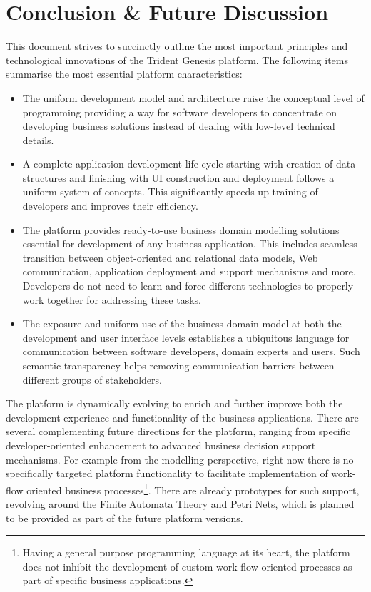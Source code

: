 \section{Conclusion \& Future Discussion}\label{sec:08}

  This document strives to succinctly outline the most important principles and technological innovations of the Trident Genesis platform.
  The following items summarise the most essential platform characteristics: 
  \begin{itemize}
    \item The uniform development model and architecture raise the conceptual level of programming providing a way for software developers to concentrate on developing business solutions instead of dealing with low-level technical details.
    \item A complete application development life-cycle starting with creation of data structures and finishing with UI construction and deployment follows a uniform system of concepts.
	This significantly speeds up training of developers and improves their efficiency.
    \item The platform provides ready-to-use business domain modelling solutions essential for development of any business application.
	  This includes seamless transition between object-oriented and relational data models, Web communication, application deployment and support mechanisms and more.
	  Developers do not need to learn and force different technologies to properly work together for addressing these tasks.
    \item The exposure and uniform use of the business domain model at both the development and user interface levels establishes a ubiquitous language for communication between software developers, domain experts and users.
	  Such semantic transparency helps removing communication barriers between different groups of stakeholders.
  \end{itemize}

  The platform is dynamically evolving to enrich and further improve both the development experience and functionality of the business applications.
  There are several complementing future directions for the platform, ranging from specific developer-oriented enhancement to advanced business decision support mechanisms.
  For example from the modelling perspective, right now there is no specifically targeted platform functionality to facilitate implementation of work-flow oriented business processes\footnote{Having a general purpose programming language at its heart, the platform does not inhibit the development of custom work-flow oriented processes as part of specific business applications.}.
  There are already prototypes for such support, revolving around the Finite Automata Theory and Petri Nets, which is planned to be provided as part of the future platform versions.
  
